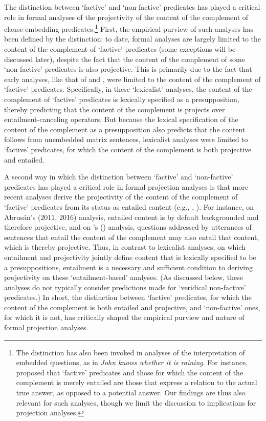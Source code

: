 \documentclass[11pt,fleqn]{article}
\newcommand{\6}{\mbox{$[\hspace*{-.6mm}[$}}
\newcommand{\9}{\mbox{$]\hspace*{-.6mm}]$}}
\newcommand{\citetpos}[1]{\citeauthor{#1}'s (\citeyear{#1})}
\begin{document}
The distinction between `factive' and `non-factive' predicates has played a critical role in formal analyses of the projectivity of the content of the complement of clause-embedding predicates.\footnote{The distinction has also been invoked in analyses of the interpretation of embedded questions, as in {\em John knows whether it is raining}. For instance, \citet{spector-egre2015} proposed that `factive' predicates and those for which the content of the complement is merely entailed are those that express a relation to the actual true answer, as opposed to a potential answer. Our findings are thus also relevant for such analyses, though we limit the discussion to implications for projection analyses.} First, the empirical purview of such analyses has been defined by the distinction: to date, formal analyses are largely limited to the content of the complement of `factive' predicates (some exceptions will be discussed later), despite the fact that the content of the complement of some `non-factive' predicates is also projective. This is primarily due to the fact that early analyses, like that of \citealt{heim83} and \citealt{vds92}, were limited to the content of the complement of `factive' predicates. Specifically, in these `lexicalist' analyses, the content of the complement of `factive' predicates is lexically specified as a presupposition, thereby predicting that the content of the complement is projects over entailment-canceling operators. But because the lexical specification of the content of the complement as a presupposition also predicts that the content follows from unembedded matrix sentences, lexicalist analyses were limited to `factive' predicates, for which the content of the complement is both projective and entailed. 

A second way in which the distinction between `factive' and `non-factive' predicates has played a critical role in formal projection analyses is that more recent analyses derive the projectivity of the content of the complement of `factive' predicates from its status as entailed content (e.g., \citealt{abrusan2011,abrusan2016}, \citealt{romoli2015,best-question}). For instance, on Abrus\'an's (2011, 2016) analysis, entailed content is by default backgrounded and therefore projective, and on \citetpos{best-question} analysis, questions addressed by utterances of sentences that entail the content of the complement may also entail that content, which is thereby projective. Thus, in contrast to lexicalist analyses, on which entailment and projectivity jointly define content that is lexically specified to be a presuppositions, entailment is a necessary and sufficient condition to deriving projectivity on these `entailment-based' analyses. (As discussed below, these analyses do not typically consider predictions made for `veridical non-factive' predicates.) In short, the distinction between `factive' predicates, for which the content of the complement is both entailed and projective, and `non-factive' ones, for which it is not, has critically shaped the empirical purview and nature of  formal projection analyses. 
\end{document}
